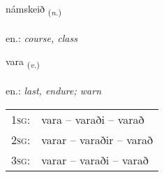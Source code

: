 \documentclass[frontgrid, backgrid]{flacards}\usepackage[]{graphicx}\usepackage[]{xcolor}
\begin{document}
\renewcommand{\flhead}{\vskip5pt \fboxsep=0pt {\small\bfseries\footnotesize Nafnorð | Noun}}
\renewcommand{\fcfoot}{\vskip5pt \fboxsep=0pt \hspace{2pt}{\small\bfseries\footnotesize 2K}}

\renewcommand{\blhead}{\vskip5pt {\small\bfseries\footnotesize Nafnorð | Noun }}
\renewcommand{\bcfoot}{\vskip5pt \hspace{2pt}{\small\bfseries\footnotesize 2K}}


{námskeið \small{\textsubscript{(\textit{n.})}} \\[1ex] %
\textphonetic{[naumsceið]} \\
en.: \emph{course, class} \\  [2ex]
\renewcommand*{\arraystretch}{0.8}
}

\renewcommand{\flhead}{\vskip5pt \fboxsep=0pt {\small\bfseries\footnotesize Sagnorð | Verb}}
\renewcommand{\fcfoot}{\vskip5pt \fboxsep=0pt \hspace{2pt}{\small\bfseries\footnotesize 2K}}

\renewcommand{\blhead}{\vskip5pt {\small\bfseries\footnotesize Sagnorð | Verb }}
\renewcommand{\bcfoot}{\vskip5pt \hspace{2pt}{\small\bfseries\footnotesize 2K}}


{vara \small{\textsubscript{(\textit{v.})}} \\[1ex] %
\textphonetic{[vaːra]} \\
en.: \emph{last, endure; warn} \\  [2ex]
\renewcommand*{\arraystretch}{0.8}
\begin{tabular}{p{1cm}l}
\textsc{1sg}: & vara -- varaði -- varað \\ 
\textsc{2sg}: & varar -- varaðir -- varað \\ 
\textsc{3sg}: & varar -- varaði -- varað \\ 
\end{tabular}
}
\end{document}
